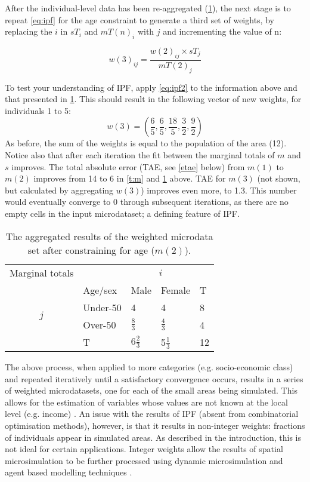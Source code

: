 \documentclass[a4paper,10pt]{article}
\begin{document}
After the individual-level data has been re-aggregated (\cref{t:m2}),
the next stage is to repeat \cref{eq:ipf} for the age constraint to generate a
third set of weights, by replacing
the $i$ in $sT_{i}$ and $mT(n)_{i}$ with $j$ and incrementing the value of n:

\begin{equation}
w(3)_{ij} = \frac{w(2)_{ij} \times sT_{j}}{mT(2)_{j}}
\label{eq:ipf2}
\end{equation}

To test your understanding of IPF, apply \cref{eq:ipf2} to the information above
and that presented in \cref{t:m2}.
This should result in the following vector of new weights, for individuals 1 to
5:
\begin{equation}
 w(3) = (\frac{6}{5}, \frac{6}{5}, \frac{18}{5}, \frac{3}{2}, \frac{9}{2})
\end{equation}
As before, the sum of the weights is equal to the population of the area (12).
Notice also that after each iteration the fit between the marginal
totals of $m$ and $s$
improves. The total absolute error (TAE, see \cref{etae} below)
from $m(1)$ to $m(2)$ improves from
14 to 6 in \cref{t:m} and \cref{t:m2} above. TAE for $m(3)$ (not shown,
but calculated by aggregating $w(3)$) improves even more, to 1.3.
This number would eventually converge to 0 through subsequent
iterations, as there are no empty cells in the input microdataset;
a defining feature of IPF.


\begin{table}[htbp]
\centering
\caption{The aggregated results of the weighted
microdata set after constraining for age ($m(2)$).
}

\begin{tabular}{cllll}\toprule
Marginal totals&  & \multicolumn{2}{c}{$i$} & \\
& Age/sex & Male & Female & T\\ \midrule
\multirow{2}{*}{$j$} & Under-50 & 4 & 4 & 8\\
& Over-50 & $\frac{8}{3}$ & $\frac{4}{3}$ & 4 \\
& T & $6\frac{2}{3}$ & 5$\frac{1}{3}$ & 12\\
\bottomrule
\end{tabular}
\label{t:m2}
\end{table}

The above process, when applied to more categories (e.g. socio-economic class)
and repeated iteratively until a satisfactory convergence occurs, results in a
series of weighted microdatasets, one for each of the small areas being
simulated. This allows for the estimation of variables whose values are not
known at the local level (e.g. income) \citep{Ballas2005}. An issue
with the results of IPF (absent from combinatorial optimisation methods),
however, is that it results in non-integer weights: fractions of individuals
appear in simulated areas. As described in the introduction, this is not ideal
for certain applications. Integer weights allow the results of spatial
microsimulation to be further processed using dynamic microsimulation and agent
based modelling techniques \citep{Pritchard2012}.
\end{document}
